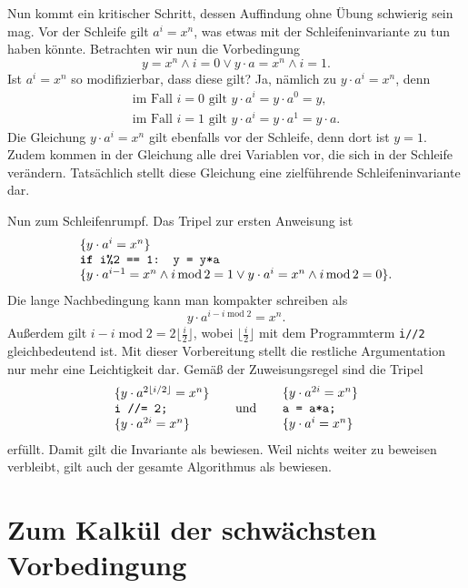 Nun kommt ein kritischer Schritt, dessen Auffindung ohne Übung schwierig
sein mag. Vor der Schleife gilt $a^i=x^n$, was etwas mit der
Schleifeninvariante zu tun haben könnte. Betrachten wir nun die Vorbedingung
\[y = x^n\land i = 0\lor y\cdot a = x^n\land i = 1.\]
Ist $a^i=x^n$ so modifizierbar, dass diese gilt? Ja, nämlich zu
$y\cdot a^i=x^n$, denn
\begin{gather*}
\text{im Fall $i = 0$ gilt $y\cdot a^i = y\cdot a^0 = y$},\\
\text{im Fall $i = 1$ gilt $y\cdot a^i = y\cdot a^1 = y\cdot a$}.
\end{gather*}
Die Gleichung $y\cdot a^i=x^n$ gilt ebenfalls vor der Schleife, denn
dort ist $y=1$. Zudem kommen in der Gleichung alle drei Variablen vor,
die sich in der Schleife verändern. Tatsächlich stellt diese Gleichung eine
zielführende Schleifeninvariante dar.

Nun zum Schleifenrumpf. Das Tripel zur ersten Anweisung ist
\[\begin{array}{l}
\{y\cdot a^i = x^n\}\\
\text{\texttt{\textbf{if} i\%2 == 1: y = y*a}}\\
\{y\cdot a^{i-1} = x^n\land i\operatorname{mod} 2 = 1
\lor y\cdot a^i = x^n\land i\operatorname{mod}2 = 0\}.
\end{array}\]
Die lange Nachbedingung kann man kompakter schreiben als
\[y\cdot a^{i-i\operatorname{mod}2} = x^n.\]
Außerdem gilt $i-i\operatorname{mod}2 = 2\lfloor\frac{i}{2}\rfloor$,
wobei $\lfloor\frac{i}{2}\rfloor$ mit dem Programmterm \texttt{i//2}
gleichbedeutend ist. Mit dieser Vorbereitung stellt die restliche
Argumentation nur mehr eine Leichtigkeit dar. Gemäß der Zuweisungsregel
sind die Tripel
\[\begin{array}{l}
\{y\cdot a^{2\lfloor i/2\rfloor} = x^n\}\\
\text{\texttt{i //= 2;}}\\
\{y\cdot a^{2i} = x^n\}
\end{array}
\quad\;\;\text{und}\quad\;\;
\begin{array}{l}
\{y\cdot a^{2i} = x^n\}\\
\text{\texttt{a = a*a;}}\\
\{y\cdot a^i = x^n\}
\end{array}\]
erfüllt. Damit gilt die Invariante als bewiesen. Weil nichts weiter zu
beweisen verbleibt, gilt auch der gesamte Algorithmus als bewiesen.

\section{Zum Kalkül der schwächsten Vorbedingung}

